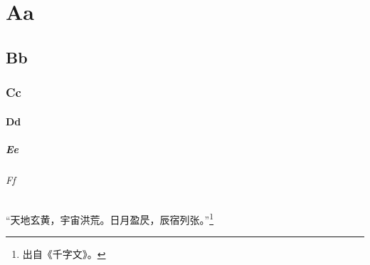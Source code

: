 \documentclass{report}
\begin{document}
	
	\chapter{Aa}
	\section{Bb}
	\subsection{Cc}
	\subsubsection{Dd}
	\paragraph{Ee}
	\subparagraph{Ff}
	
	“天地玄黄，宇宙洪荒。日月盈昃，辰宿列张。”\footnote{出自《千字文》。}
	
	
	
	
	
	
	
	
	
	
	
	
	
	
	
\end{document}
